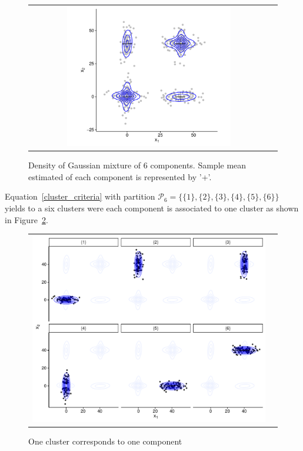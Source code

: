 \documentclass[10pt, a4paper]{article}
\begin{document}
\begin{spacing}{1.9}
\begin{figure}[thbp]
\begin{center}
\begin{tabular}{cc}
  \includegraphics[width=0.7\textwidth]{figures/partition-example-mixture.pdf} \\
 \end{tabular}
 \caption{Density of Gaussian mixture of 6 components. Sample mean estimated of each component is represented by '+'.}\label{ex_mixture}
\end{center}
\end{figure}

Equation~\ref{cluster_criteria} with partition $\mathcal{P}_6 = \{ \{1\},\{2\}, \{3\}, \{4\}, \{5\}, \{6\} \}$ yields to a six clusters were each component is associated to one cluster as shown in Figure~\ref{ex_one_one}.

\begin{figure}[h]
\begin{center}
\begin{tabular}{cc}
  \includegraphics[width=\textwidth]{figures/partition-example-part6.pdf} \\
 \end{tabular}
 \caption{One cluster corresponds to one component}\label{ex_one_one}
\end{center}
\end{figure}


\end{spacing}
\end{document}
